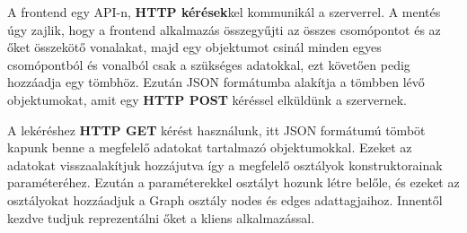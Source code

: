 A frontend egy API-n, \textbf{HTTP kérések}kel kommunikál a szerverrel. A mentés úgy zajlik, hogy a frontend alkalmazás összegyűjti az összes csomópontot és az őket összekötő vonalakat, majd egy objektumot csinál minden egyes csomópontból és vonalból csak a szükséges adatokkal, ezt követően pedig hozzáadja egy tömbhöz. Ezután JSON formátumba alakítja a tömbben lévő objektumokat, amit egy \textbf{HTTP POST} kéréssel elküldünk a szervernek.

A lekéréshez \textbf{HTTP GET} kérést használunk, itt JSON formátumú tömböt kapunk benne a megfelelő adatokat tartalmazó objektumokkal. Ezeket az adatokat visszaalakítjuk hozzájutva így a megfelelő osztályok konstruktorainak paraméteréhez. Ezután a paraméterekkel osztályt hozunk létre belőle, és ezeket az osztályokat hozzáadjuk a Graph osztály nodes és edges adattagjaihoz. Innentől kezdve tudjuk reprezentálni őket a kliens alkalmazással.